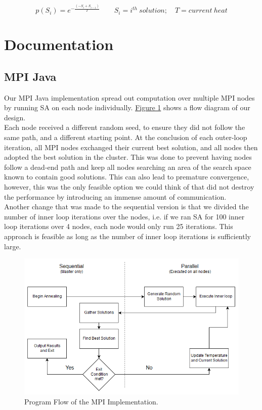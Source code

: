 \documentclass{article}
\begin{document}
		\begin{equation}\label{E_AP}
			p(S_i) = e^{-\frac{(-S_{i} + S_{i-1} )}{T}} \qquad S_i = i^{th}~solution; \quad T = current~heat
		\end{equation}
	
	\section{Documentation} \label{DOCUMENTATION}
		\subsection{MPI Java} \label{D_MPI}
			Our MPI Java implementation spread out computation over multiple MPI nodes by running SA on each node individually. \hyperref[F1]{Figure 1} shows a flow diagram of our design. \\
			
			Each node received a different random seed, to ensure they did not follow the same path, and a different starting point. At the conclusion of each outer-loop iteration, all MPI nodes exchanged their current best solution, and all nodes then adopted the best solution in the cluster. This was done to prevent having nodes follow a dead-end path and keep all nodes searching an area of the search space known to contain good solutions. This can also lead to premature convergence, however, this was the only feasible option we could think of that did not destroy the performance by introducing an immense amount of communication. \\
			
			Another change that was made to the sequential version is that we divided the number of inner loop iterations over the nodes, i.e. if we ran SA for 100 inner loop iterations over 4 nodes, each node would only run 25 iterations. This approach is feasible as long as the number of inner loop iterations is sufficiently large.
		
			\begin{figure}\label{F1}
				\caption{Program Flow of the MPI Implementation.}
				\centering
				\includegraphics[scale=0.75]{mpi_flow.png}
			\end{figure}
		
\end{document}
